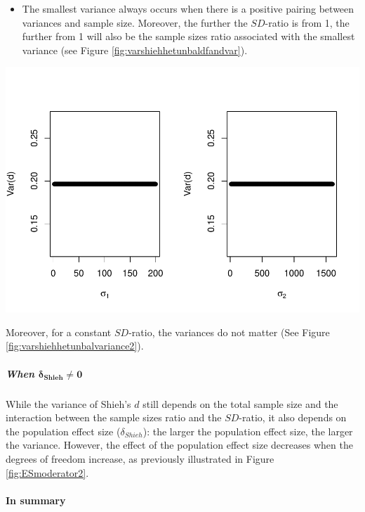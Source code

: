 \documentclass[
  english,
  man,mask]{apa6}
\providecommand{\tightlist}{%
  \setlength{\itemsep}{0pt}\setlength{\parskip}{0pt}}
\let\oldparagraph\paragraph
\renewcommand{\paragraph}[1]{\oldparagraph{#1}\mbox{}}
\let\oldsubparagraph\subparagraph
\renewcommand{\subparagraph}[1]{\oldsubparagraph{#1}\mbox{}}
\begin{document}
\begin{itemize}
\tightlist
\item
  The smallest variance always occurs when there is a positive pairing between variances and sample size. Moreover, the further the \(SD\)-ratio is from 1, the further from 1 will also be the sample sizes ratio associated with the smallest variance (see Figure \ref{fig:varshiehhetunbaldfandvar}).
\end{itemize}

\includegraphics{SupMat1_files/figure-latex/varshiehhetunbalvariance2-1.pdf}

Moreover, for a constant \(SD\)-ratio, the variances do not matter (See Figure \ref{fig:varshiehhetunbalvariance2}).

\hypertarget{when-bmdelta_shieh-neq-0-2}{%
\subparagraph{\texorpdfstring{When \(\bm{\delta_{Shieh} \neq 0}\)}{When \textbackslash bm\{\textbackslash delta\_\{Shieh\} \textbackslash neq 0\}}}\label{when-bmdelta_shieh-neq-0-2}}

While the variance of Shieh's \(d\) still depends on the total sample size and the interaction between the sample sizes ratio and the \(SD\)-ratio, it also depends on the population effect size (\(\delta_{Shieh}\)): the larger the population effect size, the larger the variance. However, the effect of the population effect size decreases when the degrees of freedom increase, as previously illustrated in Figure \ref{fig:ESmoderator2}.

\hypertarget{in-summary-4}{%
\paragraph{In summary}\label{in-summary-4}}
\end{document}
